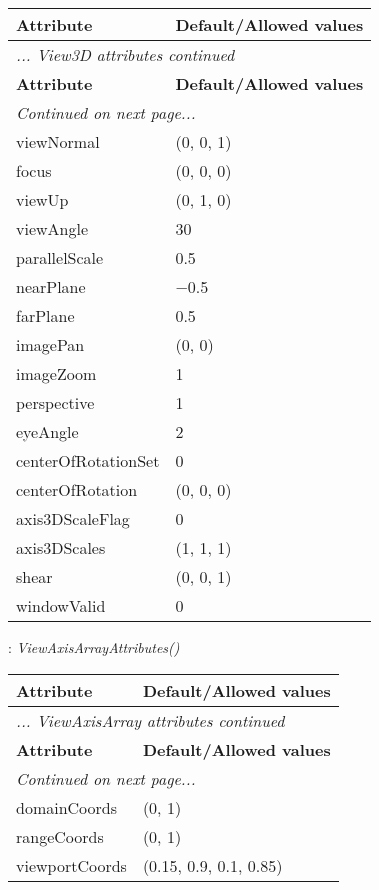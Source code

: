 \documentclass[10pt,a4paper]{report}
\begin{document}
\begin{longtable}{ll}
{\bf Attribute} & {\bf Default/Allowed values} \\
\hline \hline
\endfirsthead
\multicolumn{2}{l}{{\it ... View3D attributes continued}} \\
{\bf Attribute} & {\bf Default/Allowed values} \\
\hline \hline
\endhead
\hline
\multicolumn{2}{l}{{\it Continued on next page...}} \\
\endfoot
\hline
\endlastfoot

viewNormal  &  (0, 0, 1) \\
focus  &  (0, 0, 0) \\
viewUp  &  (0, 1, 0) \\
viewAngle  &  30 \\
parallelScale  &  0.5 \\
nearPlane  &  $-$0.5 \\
farPlane  &  0.5 \\
imagePan  &  (0, 0) \\
imageZoom  &  1 \\
perspective  &  1 \\
eyeAngle  &  2 \\
centerOfRotationSet  &  0 \\
centerOfRotation  &  (0, 0, 0) \\
axis3DScaleFlag  &  0 \\
axis3DScales  &  (1, 1, 1) \\
shear  &  (0, 0, 1) \\
windowValid  &  0 \\
\end{longtable}

\newpage

{}
: {\it ViewAxisArrayAttributes() }\\[-3mm]

\begin{longtable}{ll}
{\bf Attribute} & {\bf Default/Allowed values} \\
\hline \hline
\endfirsthead
\multicolumn{2}{l}{{\it ... ViewAxisArray attributes continued}} \\
{\bf Attribute} & {\bf Default/Allowed values} \\
\hline \hline
\endhead
\hline
\multicolumn{2}{l}{{\it Continued on next page...}} \\
\endfoot
\hline
\endlastfoot

domainCoords  &  (0, 1) \\
rangeCoords  &  (0, 1) \\
viewportCoords  &  (0.15, 0.9, 0.1, 0.85) \\
\end{longtable}
\end{document}
